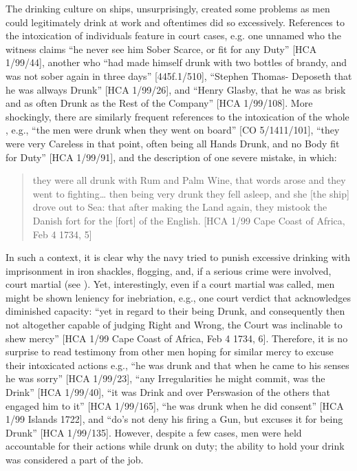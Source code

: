 The drinking culture on ships, unsurprisingly, created some problems as men could legitimately drink at work and oftentimes did so excessively. References to the intoxication of individuals feature in court cases, e.g. one unnamed  who the witness claims “he never see him Sober Scarce, or fit for any Duty” [HCA 1/99/44], another who “had made himself drunk with two bottles of brandy, and was not sober again in three days” [445f.1/510], “Stephen Thomas- Deposeth that he was allways Drunk” [HCA 1/99/26], and “Henry Glasby, that he was as brisk and as often Drunk as the Rest of the Company” [HCA 1/99/108]. More shockingly, there are similarly frequent references to the intoxication of the whole , e.g., “the men were drunk when they went on board” [CO 5/1411/101], “they were very Careless in that point, often being all Hands Drunk, and no Body fit for Duty” [HCA 1/99/91], and the description of one severe mistake, in which: 

\begin{quotation}
they were all drunk with Rum and Palm Wine, that words arose and they went to fighting… then being very drunk they fell asleep, and she [the ship] drove out to Sea: that after making the Land again, they mistook the Danish fort for the [fort] of the English. [HCA 1/99 Cape Coast of Africa, Feb 4 1734, 5]
\end{quotation}

In such a context, it is clear why the navy tried to punish excessive drinking with imprisonment in iron shackles, flogging, and, if a serious crime were involved, court martial (see ). Yet, interestingly, even if a court martial was called, men might be shown leniency for inebriation, e.g., one court verdict that acknowledges diminished capacity: “yet in regard to their being Drunk, and consequently then not altogether capable of judging Right and Wrong, the Court was inclinable to shew mercy” [HCA 1/99 Cape Coast of Africa, Feb 4 1734, 6]. Therefore, it is no surprise to read testimony from other men hoping for similar mercy to excuse their intoxicated actions e.g., “he was drunk and that when he came to his senses he was sorry” [HCA 1/99/23], “any Irregularities he might commit, was the Drink” [HCA 1/99/40], “it was Drink and over Perswasion of the others that engaged him to it” [HCA 1/99/165], “he was drunk when he did consent” [HCA 1/99  Islands 1722], and “do’s not deny his firing a Gun, but excuses it for being Drunk” [HCA 1/99/135]. However, despite a few cases, men were held accountable for their actions while drunk on duty; the ability to hold your drink was considered a part of the job. 

